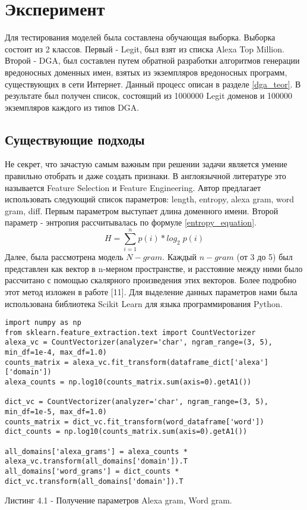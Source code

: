 \section{Эксперимент}\label{experiment}
    Для тестирования моделей была составлена обучающая выборка. Выборка состоит из 2 классов. Первый - Legit, был взят из списка Alexa Top Million. Второй - DGA, был составлен путем обратной разработки алгоритмов генерации вредоносных доменных имен, взятых из экземпляров вредоносных программ, существующих в сети Интернет. Данный процесс описан в разделе \ref{dga_teor}. В результате был получен список, состоящий из 1000000 Legit доменов и 100000 экземпляров каждого из типов DGA.
    \subsection{Существующие подходы}\label{be_class_exp}
    Не секрет, что зачастую самым важным при решении задачи является умение правильно отобрать и даже создать признаки. В англоязычной литературе это называется Feature Selection и Feature Engineering. Автор предлагает использовать следующий список параметров: length, entropy, alexa gram, word gram, diff.
    Первым параметром выступает длина доменного имени.
    Второй параметр - энтропия рассчитывалась по формуле \ref{entropy_equation}.
    \begin{equation}\label{entropy_equation}
    H = \sum_{i=1}^{n} p(i)*log_{2}\;p(i{})
    \end{equation}
    Далее, была рассмотрена модель $N-gram$. Каждый $n-gram$ (от 3 до 5) был представлен как вектор в n-мерном пространстве, и расстояние между ними было рассчитано с помощью скалярного произведения этих векторов. Более подробно этот метод изложен в работе [11].
    Для выделение данных параметров нами была использована библиотека Scikit Learn для языка программирования Python.
    \begin{lstlisting}
import numpy as np
from sklearn.feature_extraction.text import CountVectorizer
alexa_vc = CountVectorizer(analyzer='char', ngram_range=(3, 5), min_df=1e-4, max_df=1.0)
counts_matrix = alexa_vc.fit_transform(dataframe_dict['alexa']['domain'])
alexa_counts = np.log10(counts_matrix.sum(axis=0).getA1())

dict_vc = CountVectorizer(analyzer='char', ngram_range=(3, 5), min_df=1e-5, max_df=1.0)
counts_matrix = dict_vc.fit_transform(word_dataframe['word'])
dict_counts = np.log10(counts_matrix.sum(axis=0).getA1())

all_domains['alexa_grams'] = alexa_counts * alexa_vc.transform(all_domains['domain']).T
all_domains['word_grams'] = dict_counts * dict_vc.transform(all_domains['domain']).T
    \end{lstlisting}
    Листинг 4.1 - Получение параметров Alexa gram, Word gram.

